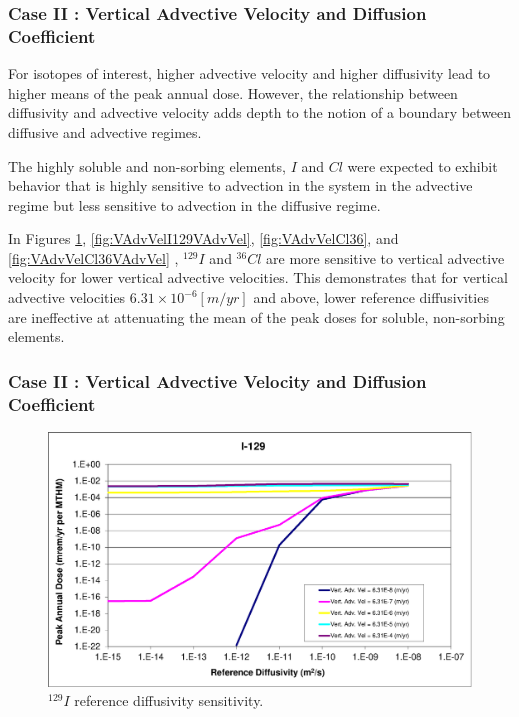 \begin{frame}[c]
  \frametitle{Case II : Vertical Advective Velocity and Diffusion Coefficient}
For isotopes of interest, higher advective velocity and higher diffusivity lead to higher 
means of the peak annual dose. However, the relationship between diffusivity and 
advective velocity adds depth to the notion of a boundary between diffusive and 
advective regimes.

The highly soluble and non-sorbing elements, $I$ and $Cl$ 
were expected to exhibit behavior that is highly sensitive 
to advection in the system in the advective regime but less sensitive to 
advection in the diffusive regime.  

In Figures \ref{fig:VAdvVelI129}, \ref{fig:VAdvVelI129VAdvVel}, 
\ref{fig:VAdvVelCl36}, and \ref{fig:VAdvVelCl36VAdvVel} , $^{129}I$ and 
$^{36}Cl$ are more sensitive to vertical advective velocity for lower vertical 
advective velocities. This demonstrates that for vertical advective velocities 
$6.31\times10^{-6}[m/yr]$ and above, lower reference diffusivities are 
ineffective at attenuating the mean of the peak doses for soluble, non-sorbing 
elements. 
\end{frame}

\begin{frame}[c]
  \frametitle{Case II : Vertical Advective Velocity and Diffusion Coefficient}
\begin{figure}[htp!]
\centering
\includegraphics[width=\linewidth]{AdvVelAndDiffCoeffEBSFail/I-129.eps}
\caption{$^{129}I$ reference diffusivity sensitivity.}
\label{fig:VAdvVelI129}
\end{figure}
\end{frame}


